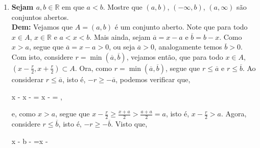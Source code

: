 \documentclass[%
  a4paper,%
  12pt,%
  fleqn,%
  english,%
  brazilian,%
]{article}
\newcommand{\bR}{\mathbb R}
\newcommand{\parth}[1]{\left(#1\right)}
\begin{document}
\begin{enumerate}
	\item \textbf{Sejam $a, b \in \bR$} em que $a<b$. Mostre que $(a, b)$, $(-\infty, b)$, $(a, \infty)$ são conjuntos abertos.\\
	\textbf{Dem:} Vejamos que $A = (a, b)$ é um conjunto aberto. Note que para todo $x \in A$, $x \in \bR$ e $a<x<b$. Mais ainda, sejam $\overline{a} = x - a$ e $\overline{b} = b - x$. Como $x>a$, segue que $\overline{a} = x-a > 0$, ou seja $\overline{a} > 0$, analogamente temos $\overline{b} > 0$. Com isto, considere $r = \min(\overline{a}, \overline{b})$, vejamos então, que para todo $x \in A$, $\parth{x - \frac{r}{2}, x + \frac{r}{2}} \subset A$. Ora, como $r = \min(\overline{a}, \overline{b})$, segue que $r \leq \overline{a}$ e $r \leq \overline{b}$. Ao considerar $r \leq \overline{a}$, isto é, $-r \geq -\overline{a}$, podemos verificar que,
	
	\begin{ceqnalign}
		x -  \geq x -  = x -  = ,
	\end{ceqnalign}
	
	e, como $x > a$, segue que $x - \frac{r}{2} \geq \frac{x+a}{2} > \frac{a+a}{2} = a$, isto é, $x - \frac{r}{2} > a$. Agora, considere $r \leq \overline{b}$, isto é, $-r \geq -\overline{b}$. Visto que,
	
	\begin{ceqnalign}
		x -  \leq b -  =x - \frac{b - x}{2}
	\end{ceqnalign}
	
	
\end{enumerate}
\end{document}
